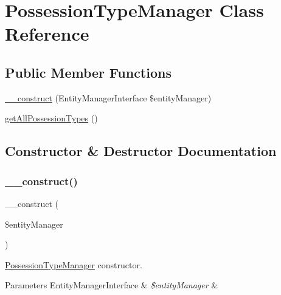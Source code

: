 \hypertarget{class_app_1_1_b_l_1_1_possession_type_manager}{}\section{Possession\+Type\+Manager Class Reference}
\label{class_app_1_1_b_l_1_1_possession_type_manager}
\subsection*{Public Member Functions}
\begin{DoxyCompactItemize}
\item 
\mbox{\hyperlink{class_app_1_1_b_l_1_1_possession_type_manager_abb5fb9a65dd8a81e7482dddbf71c5177}{\+\_\+\+\_\+construct}} (Entity\+Manager\+Interface \$entity\+Manager)
\item 
\mbox{\hyperlink{class_app_1_1_b_l_1_1_possession_type_manager_a443ec48b7dd0ee85b22203c22f61efe2}{get\+All\+Possession\+Types}} ()
\end{DoxyCompactItemize}


\subsection{Constructor \& Destructor Documentation}
\mbox{\label{class_app_1_1_b_l_1_1_possession_type_manager_abb5fb9a65dd8a81e7482dddbf71c5177}} 
\subsubsection{\texorpdfstring{\_\_construct()}{\_\_construct()}}
{\footnotesize\ttfamily \+\_\+\+\_\+construct (\begin{DoxyParamCaption}\item[{Entity\+Manager\+Interface}]{\$entity\+Manager }\end{DoxyParamCaption})}

\mbox{\hyperlink{class_app_1_1_b_l_1_1_possession_type_manager}{Possession\+Type\+Manager}} constructor. 
\begin{DoxyParams}[1]{Parameters}
Entity\+Manager\+Interface & {\em \$entity\+Manager} & \\
\hline
\end{DoxyParams}



